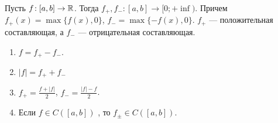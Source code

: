 \begin{definition}
    Пусть $f\!: [a, b] \to \mathbb{R}$. Тогда  $f_+, f_-\!: [a, b] \to [0; +\inf)$. Причем  $f_+(x) = \max\{f(x), 0\}$,  $f_- = \max\{-f(x), 0\}$. $f_+$ --- положительная составляющая, а $f_-$ --- отрицательная составляющая.
\end{definition}
\begin{properties}
    \begin{enumerate}
        \item $f = f_+ - f_-$.
        \item  $|f| = f_+ + f_-$
        \item  $f_+ = \frac{f + |f|}{2}$, $f_- = \frac{|f| - f}{2}$.
        \item Если $f \in C([a, b])$ , то  $f_{\pm} \in C([a, b])$.
    \end{enumerate}
\end{properties}

